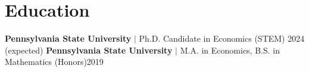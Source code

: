 \section{Education}
  \resumeSubHeadingListStart
    \resumeSubSubheading
      {\textbf{Pennsylvania State University} $|$ Ph.D. Candidate in Economics (STEM) }{2024 (expected)}
      \resumeItemListStart
      \resumeItemListEnd
    \resumeSubSubheading
      {\textbf{Pennsylvania State University} $|$ M.A. in Economics, B.S. in Mathematics (Honors)}{2019}
  \resumeSubHeadingListEnd